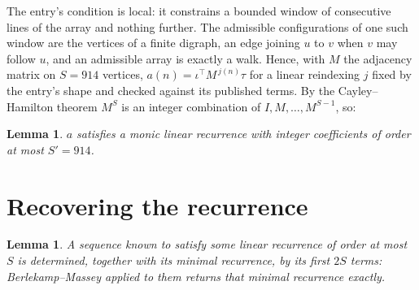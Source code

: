 \documentclass[11pt,a4paper]{article}
\theoremstyle{plain}
\newtheorem{lemma}[theorem]{Lemma}
\theoremstyle{definition}
\begin{document}
The entry's condition is local: it constrains a bounded window of consecutive lines of the
array and nothing further. The admissible configurations of one such window are the vertices
of a finite digraph, an edge joining $u$ to $v$ when $v$ may follow $u$, and an admissible
array is exactly a walk. Hence, with $M$ the adjacency matrix on $S=914$ vertices,
$a(n)=\iota^{\!\top}M^{\,j(n)}\tau$ for a linear reindexing $j$ fixed by the entry's shape
and checked against its published terms. By the Cayley--Hamilton theorem $M^{S}$ is an
integer combination of $I,M,\dots,M^{S-1}$, so:

\begin{lemma}\label{lem:cf}
$a$ satisfies a monic linear recurrence with integer coefficients of order at most
$S'=914$.
\end{lemma}

\section{Recovering the recurrence}

\begin{lemma}\label{lem:bm}
A sequence known to satisfy some linear recurrence of order at most $S$ is determined, together
with its minimal recurrence, by its first $2S$ terms: Berlekamp--Massey applied to them returns
that minimal recurrence exactly.
\end{lemma}
\end{document}

